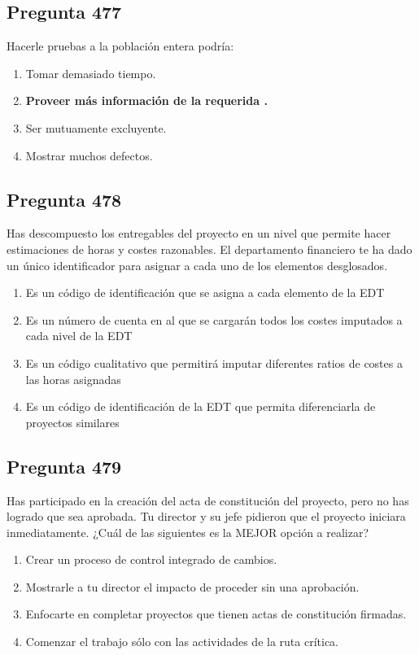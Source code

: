 \documentclass[11pt,a4paper]{article}
\begin{document}
\subsection*{Pregunta 477}
Hacerle pruebas a la población entera podría:

\begin{enumerate}[label=\alph*)]
  \item Tomar demasiado tiempo.
  \item \textbf{Proveer más información de la requerida .}
  \item Ser mutuamente excluyente.
  \item Mostrar muchos defectos.
\end{enumerate}

\subsection*{Pregunta 478}
Has descompuesto los entregables del proyecto en un nivel que permite hacer estimaciones de horas y costes razonables. El departamento financiero te ha dado un único identificador para asignar a cada uno de los elementos desglosados.

\begin{enumerate}[label=\alph*)]
  \item Es un código de identificación que se asigna a cada elemento de la EDT
  \item Es un número de cuenta en al que se cargarán todos los costes imputados a cada nivel de la EDT
  \item Es un código cualitativo que permitirá imputar diferentes ratios de costes a las horas asignadas
  \item Es un código de identificación de la EDT que permita diferenciarla de proyectos similares
\end{enumerate}

\subsection*{Pregunta 479}
Has participado en la creación del acta de constitución del proyecto, pero no has logrado que sea aprobada. Tu director y su jefe pidieron que el proyecto iniciara inmediatamente. ¿Cuál de las siguientes es la MEJOR opción a realizar?

\begin{enumerate}[label=\alph*)]
  \item Crear un proceso de control integrado de cambios.
  \item Mostrarle a tu director el impacto de proceder sin una aprobación.
  \item Enfocarte en completar proyectos que tienen actas de constitución firmadas.
  \item Comenzar el trabajo sólo con las actividades de la ruta crítica.
\end{enumerate}
\end{document}
